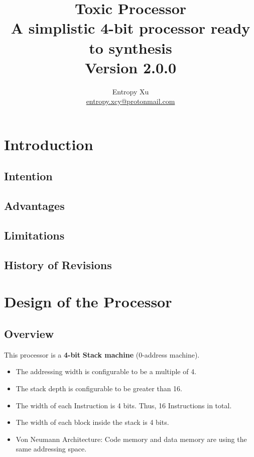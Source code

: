 \documentclass[11pt]{report}
\begin{document}
\begin{titlepage}
    \thispagestyle{empty}
    \title{%
    Toxic Processor \\
    \large A simplistic 4-bit processor ready to synthesis \\ 
    Version 2.0.0}
    \author{Entropy Xu \\ 
            \href{mailto:entropy.xcy@protonmail.com}{entropy.xcy@protonmail.com} }
    \maketitle
    \end{titlepage}
    \tableofcontents


    \chapter{Introduction}
    \section{Intention}
    \section{Advantages}
    \section{Limitations}
    \section{History of Revisions}


    \chapter{Design of the Processor}
    \label{chapter:design}
    \section{Overview}
    This processor is a \textbf{4-bit} \textbf{Stack machine} (0-address machine).
    \begin{itemize}
        \item The addressing width is configurable to be a multiple of 4.
        \item The stack depth is configurable to be greater than 16.
        \item The width of each Instruction is 4 bits. Thus, 16 Instructions in total.
        \item The width of each block inside the stack is 4 bits.
        \item Von Neumann Architecture: Code memory and data memory are using the same addressing space.
    \end{itemize}
\end{document}
